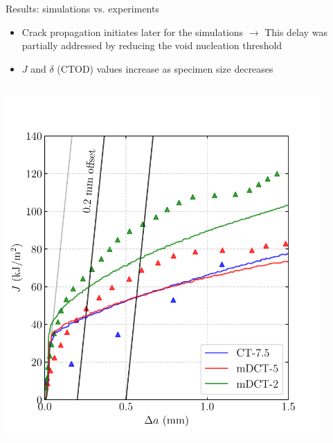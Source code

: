 \documentclass[9pt]{beamer}
\begin{document}

\begin{frame}{Results: simulations vs. experiments}

\begin{itemize}
    \item Crack propagation initiates later for the simulations $\rightarrow$ This delay was partially addressed by reducing the void nucleation threshold
    \vspace{0.15cm}
    \item $J$ and $\delta$ (CTOD) values increase as specimen size decreases
\end{itemize}

\begin{columns}
    \centering
    \includegraphics[width=0.9\textwidth]{Images/plot_J-da_ALL_X52.pdf}
    

\end{columns}
\end{frame}
\end{document}
